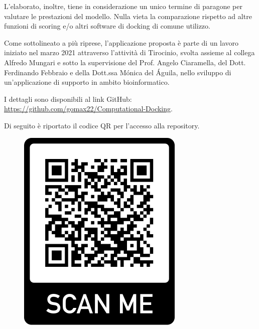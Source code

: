 \noindent L'elaborato, inoltre, tiene in considerazione un unico termine di paragone per valutare le prestazioni del modello. Nulla vieta la comparazione rispetto ad altre funzioni di scoring e/o altri software di docking di comune utilizzo.

\noindent Come sottolineato a più riprese, l'applicazione proposta è parte di un lavoro iniziato nel marzo 2021 attraverso l'attività di Tirocinio, svolta assieme al collega Alfredo Mungari e sotto la supervisione del Prof. Angelo Ciaramella, del Dott. Ferdinando Febbraio e della Dott.ssa Mónica del Águila, nello sviluppo di un'applicazione di supporto in ambito bioinformatico.

\noindent I dettagli sono disponibili al link GitHub:\\ \url{https://github.com/gomax22/Computational-Docking}.


\noindent Di seguito è riportato il codice QR per l'accesso alla repository.

\vskip 1.5cm
\begin{figure}[H]
    \centering
    \includegraphics[scale=0.5]{images/frame.png}
\end{figure}

